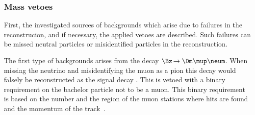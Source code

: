 \subsubsection*{Mass vetoes}

First, the investigated sources of backgrounds which arise due to failures in the reconstrucion, and if necessary, the applied vetoes are described.
Such failures can be missed neutral particles or misidentified particles in the reconstruction.

The first type of backgrounds arises from the decay $\Bz\!\to\Dm\mup\neum$. When missing the neutrino and misidentifying the muon as a pion this decay would falsely be reconstructed as the signal decay \BdToDpi.
This is vetoed with a binary requirement on the bachelor particle not to be a muon.
This binary requirement is based on the number and the region of the muon stations where hits are found and the momentum of the track~\cite{Archilli:2013npa}.

